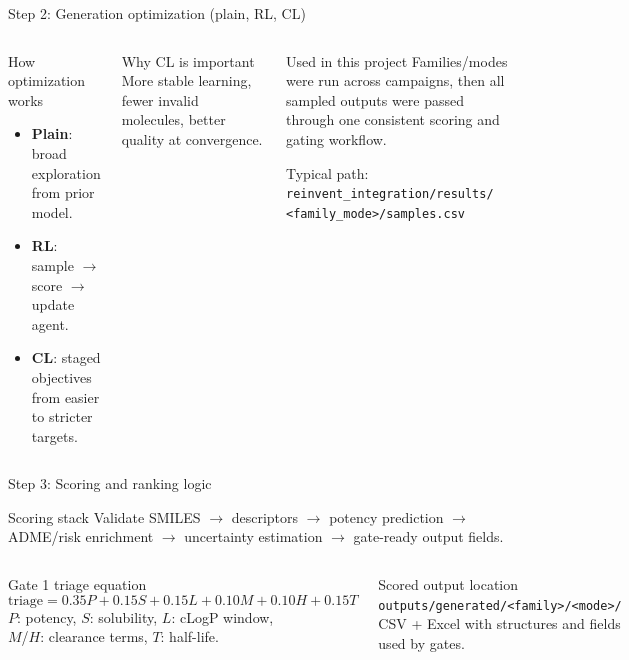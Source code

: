 \documentclass[aspectratio=169,10pt]{beamer}
\begin{document}
\begin{frame}{Step 2: Generation optimization (plain, RL, CL)}
  \begin{columns}[T]
      \begin{block}{How optimization works}
        \begin{itemize}
          \item \textbf{Plain}: broad exploration from prior model.
          \item \textbf{RL}: sample \(\rightarrow\) score \(\rightarrow\) update agent.
          \item \textbf{CL}: staged objectives from easier to stricter targets.
        \end{itemize}
      \end{block}
      \begin{exampleblock}{Why CL is important}
        More stable learning, fewer invalid molecules,
        better quality at convergence.
      \end{exampleblock}
      \begin{block}{Used in this project}
        Families/modes were run across campaigns, then all sampled outputs
        were passed through one consistent scoring and gating workflow.

        \vspace{3pt}
        Typical path:\\
        {\scriptsize\texttt{reinvent\_integration/results/}}\\
        {\scriptsize\texttt{<family\_mode>/samples.csv}}
      \end{block}
  \end{columns}
\end{frame}

\begin{frame}{Step 3: Scoring and ranking logic}
  \small
  \begin{block}{Scoring stack}
    Validate SMILES \(\rightarrow\) descriptors \(\rightarrow\) potency prediction
    \(\rightarrow\) ADME/risk enrichment \(\rightarrow\) uncertainty estimation
    \(\rightarrow\) gate-ready output fields.
  \end{block}

  \begin{columns}[T]
      \begin{block}{Gate 1 triage equation}
      \[
\text{triage}=0.35P+0.15S+0.15L+0.10M+0.10H+0.15T
      \]
      \(P\): potency, \(S\): solubility, \(L\): cLogP window,\\
      \(M\)/\(H\): clearance terms, \(T\): half-life.
      \end{block}
      \begin{block}{Scored output location}
        \texttt{outputs/generated/<family>/<mode>/}\\
        CSV + Excel with structures and fields used by gates.
      \end{block}
  \end{columns}
\end{frame}
\end{document}
